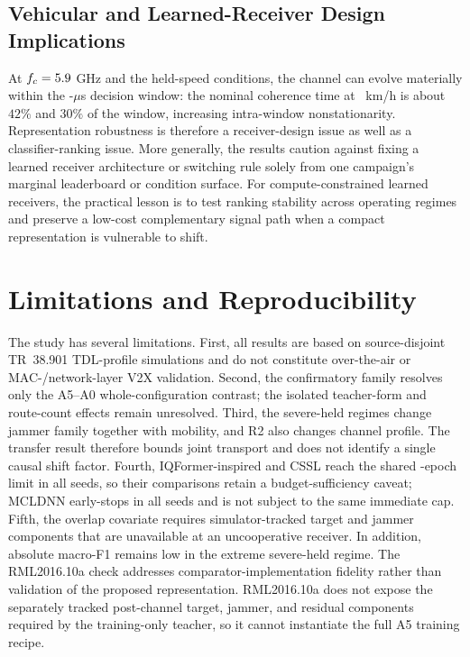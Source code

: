 \documentclass[letterpaper,journal]{IEEEtran}
\begin{document}
\subsection{Vehicular and Learned-Receiver Design Implications}
At $f_c=5.9$ GHz and the held-speed conditions, the channel can evolve
materially within the \WindowMicroseconds-$\mu$s decision window: the nominal
coherence time at \HeldSpeeds\ km/h is about $42\%$ and $30\%$ of the window,
increasing intra-window nonstationarity. Representation robustness is
therefore a receiver-design issue as well as a classifier-ranking issue. More
generally, the results caution against fixing a learned receiver architecture
or switching rule solely from one campaign's marginal leaderboard or condition
surface. For compute-constrained learned receivers, the practical lesson is to
test ranking stability across operating regimes and preserve a low-cost
complementary signal path when a compact representation is vulnerable to
shift.

\section{Limitations and Reproducibility}
The study has several limitations. First, all results are based on
\mbox{source-disjoint} TR~38.901 TDL-profile simulations and do not
constitute over-the-air or MAC-/network-layer V2X validation. Second, the
confirmatory family resolves only the A5--A0 whole-configuration contrast; the
isolated teacher-form and route-count effects remain unresolved.
Third, the severe-held regimes change jammer family together with mobility,
and R2 also changes channel profile. The transfer result therefore bounds
joint transport and does not identify a single causal shift factor. Fourth,
IQFormer-inspired and CSSL reach the shared \TrainEpochs-epoch limit in all
seeds, so their comparisons retain a budget-sufficiency caveat; MCLDNN
early-stops in all seeds and is not subject to the same immediate cap. Fifth,
the overlap covariate requires simulator-tracked target and jammer components
that are unavailable at an uncooperative receiver. In addition, absolute
macro-F1 remains low in the extreme severe-held regime. The RML2016.10a check
addresses comparator-implementation fidelity rather than validation of the
proposed representation.
RML2016.10a does not expose the separately tracked post-channel target, jammer,
and residual components required by the training-only teacher, so it cannot
instantiate the full A5 training recipe.
\end{document}
